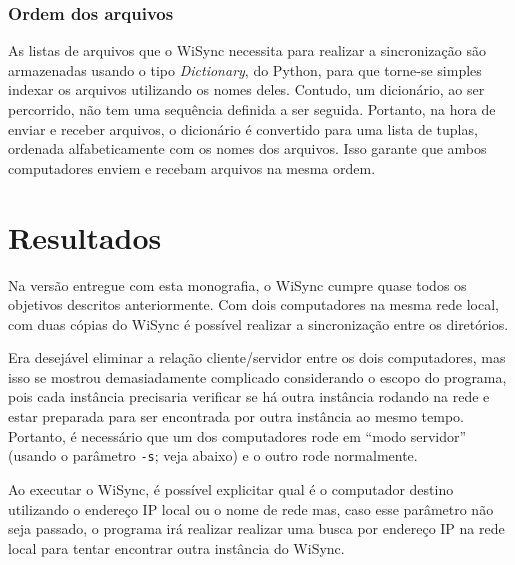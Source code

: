 \documentclass[12pt,a4paper]{ufpr}
\begin{document}
\subsection{Ordem dos arquivos}
As listas de arquivos que o WiSync necessita para realizar a sincronização são armazenadas usando o tipo \textit{Dictionary}, do Python, para que torne-se simples indexar os arquivos utilizando os nomes deles.
Contudo, um dicionário, ao ser percorrido, não tem uma sequência definida a ser seguida. 
Portanto, na hora de enviar e receber arquivos, o dicionário é convertido para uma lista de tuplas, ordenada alfabeticamente com os nomes dos arquivos.
Isso garante que ambos computadores enviem e recebam arquivos na mesma ordem.


\chapter{Resultados}
\label{resultados}

Na versão entregue com esta monografia, o WiSync cumpre quase todos os objetivos descritos anteriormente.
Com dois computadores na mesma rede local, com duas cópias do WiSync é possível realizar a sincronização entre os diretórios.

Era desejável eliminar a relação cliente/servidor entre os dois computadores, mas isso se mostrou demasiadamente complicado considerando o escopo do programa, pois cada instância precisaria verificar se há outra instância rodando na rede e estar preparada para ser encontrada por outra instância ao mesmo tempo.
Portanto, é necessário que um dos computadores rode em ``modo servidor'' (usando o parâmetro \texttt{-s}; veja abaixo) e o outro rode normalmente.

Ao executar o WiSync, é possível explicitar qual é o computador destino utilizando o endereço IP local ou o nome de rede mas, caso esse parâmetro não seja passado, o programa irá realizar realizar uma busca por endereço IP na rede local para tentar encontrar outra instância do WiSync.
\end{document}

